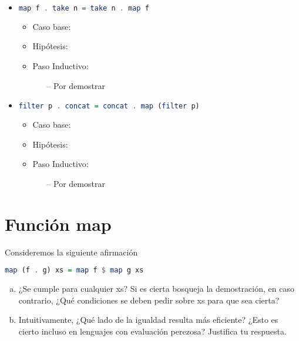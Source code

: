 \documentclass[spanish,12pt,letterpaper]{article}
\begin{document}
\begin{itemize}
\item
  \begin{lstlisting}[language=Haskell]
    map f . take n = take n . map f
  \end{lstlisting}
  \begin{itemize}
  \item Caso base:
  \item Hipótesis:
  \item Paso Inductivo:
  	\begin{itemize}
  	\item[--] Por demostrar
  	\end{itemize}
  \end{itemize}
\item
  \begin{lstlisting}[language=Haskell]
    filter p . concat = concat . map (filter p)
  \end{lstlisting}
\begin{itemize}
  \item Caso base:
  \item Hipótesis:
  \item Paso Inductivo:
  	\begin{itemize}
  	\item[--] Por demostrar
  	\end{itemize}
  \end{itemize}
\end{itemize}


\section{Función map}
Consideremos la siguiente afirmación
\begin{lstlisting}[language=Haskell]
  map (f . g) xs = map f $ map g xs
\end{lstlisting}
\begin{enumerate}[(a)]
\item ¿Se cumple para cualquier xs? Si es cierta bosqueja la demostración, en
  caso contrario, ¿Qué condiciones se deben pedir sobre xs para que sea cierta?
\item Intuitivamente, ¿Qué lado de la igualdad resulta más eficiente? ¿Esto es
  cierto incluso en lenguajes con evaluación perezosa? Justifica tu respuesta.
\end{enumerate}
\end{document}
